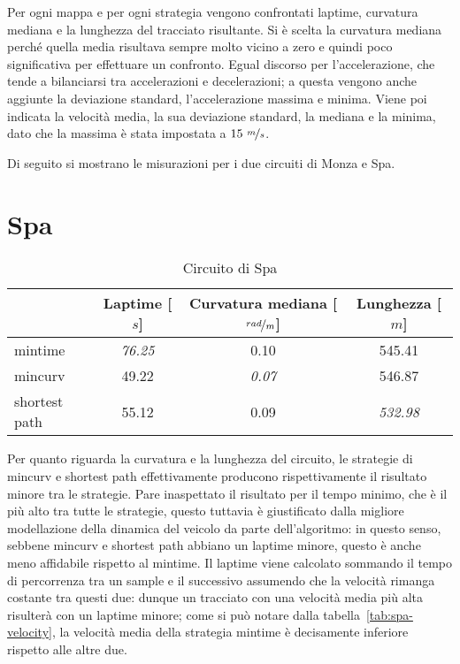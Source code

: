Per ogni mappa e per ogni strategia vengono confrontati laptime, curvatura mediana e la lunghezza del
tracciato risultante. Si è scelta la curvatura mediana perché quella media risultava sempre molto
vicino a zero e quindi poco significativa per effettuare un confronto. Egual discorso per
l'accelerazione, che tende a bilanciarsi tra accelerazioni e decelerazioni; a questa vengono anche
aggiunte la deviazione standard, l'accelerazione massima e minima. Viene poi indicata la velocità media,
la sua deviazione standard, la mediana e la minima, dato che la massima è stata impostata a $15\
\nicefrac{m}{s}$.

Di seguito si mostrano le misurazioni per i due circuiti di Monza e Spa.

\section{Spa}
\label{sec:spa}
\begin{table}[H]
	\caption{Circuito di Spa}
	\label{tab:opt-spa}
	\begin{center}
		\begin{tabular} {l|c|c|c}
			                & Laptime [$s$]  & Curvatura mediana [$\nicefrac{rad}{m}$] & Lunghezza [$m$]\\
			\hline
			mintime         & \textit{76.25} & 0.10           & 545.41          \\
			mincurv         & 49.22          & \textit{0.07 } & 546.87          \\
			shortest path   & 55.12          & 0.09           & \textit{532.98} \\
			\hline
		\end{tabular}
	\end{center}
\end{table}
Per quanto riguarda la curvatura e la lunghezza del circuito, le strategie di mincurv e shortest path
effettivamente producono rispettivamente il risultato minore tra le strategie. Pare inaspettato il
risultato per il tempo minimo, che è il più alto tra tutte le strategie, questo tuttavia è giustificato
dalla migliore modellazione della dinamica del veicolo da parte dell'algoritmo: in questo senso, sebbene
mincurv e shortest path abbiano un laptime minore, questo è anche meno affidabile rispetto al mintime. Il
laptime viene calcolato sommando il tempo di percorrenza tra un sample e il successivo assumendo che la
velocità rimanga costante tra questi due: dunque un tracciato con una velocità media più alta risulterà
con un laptime minore; come si può notare dalla tabella~\ref{tab:spa-velocity}, la velocità media della
strategia mintime è decisamente inferiore rispetto alle altre due.

